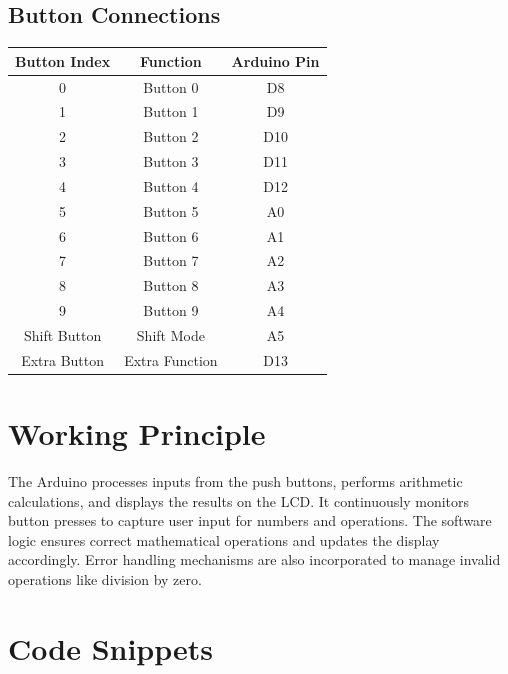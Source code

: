 \documentclass[journal]{IEEEtran}
\begin{document}
\subsection{Button Connections}

\begin{center}
\begin{tabular}{|c|c|c|}
    \hline
    \textbf{Button Index} & \textbf{Function} & \textbf{Arduino Pin} \\
    \hline
    0  & Button 0         & D8  \\
    1  & Button 1         & D9  \\
    2  & Button 2         & D10  \\
    3  & Button 3         & D11  \\
    4  & Button 4         & D12  \\
    5  & Button 5         & A0  \\
    6  & Button 6         & A1  \\
    7  & Button 7         & A2   \\
    8  & Button 8         & A3   \\
    9  & Button 9         & A4  \\
    Shift Button & Shift Mode       & A5    \\
    Extra Button & Extra Function   & D13   \\
    \hline
\end{tabular}
\end{center}


\section{Working Principle}
The Arduino processes inputs from the push buttons, performs arithmetic calculations, and displays the results on the LCD. It continuously monitors button presses to capture user input for numbers and operations. The software logic ensures correct mathematical operations and updates the display accordingly. Error handling mechanisms are also incorporated to manage invalid operations like division by zero.

\section*{Code Snippets}
\end{document}
